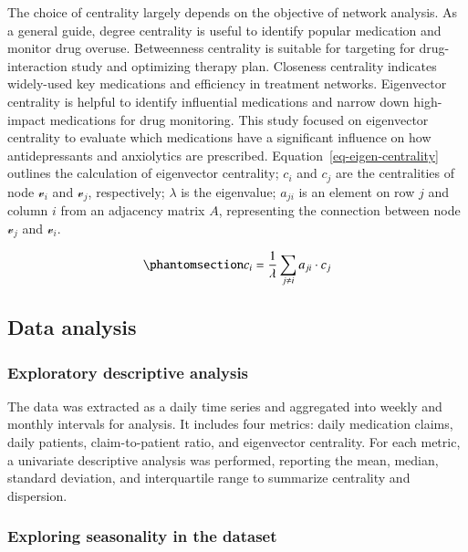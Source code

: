\documentclass[
  authoryear,
  review]{elsarticle}
\begin{document}
The choice of centrality largely depends on the objective of network
analysis. As a general guide, degree centrality is useful to identify
popular medication and monitor drug overuse. Betweenness centrality is
suitable for targeting for drug-interaction study and optimizing therapy
plan. Closeness centrality indicates widely-used key medications and
efficiency in treatment networks. Eigenvector centrality is helpful to
identify influential medications and narrow down high-impact medications
for drug monitoring. This study focused on eigenvector centrality to
evaluate which medications have a significant influence on how
antidepressants and anxiolytics are prescribed.
Equation~\ref{eq-eigen-centrality} outlines the calculation of
eigenvector centrality; \(c_i\) and \(c_j\) are the centralities of node
\(\mathcal{v}_i\) and \(\mathcal{v}_j\), respectively; \(\lambda\) is
the eigenvalue; \(a_{ji}\) is an element on row \(j\) and column \(i\)
from an adjacency matrix \(A\), representing the connection between node
\(\mathcal{v}_j\) and \(\mathcal{v}_i\).

\begin{equation}\phantomsection\label{eq-eigen-centrality}{
\displaystyle c_i = \frac{1}{\lambda} \sum_{j \neq i} a_{ji} \cdot c_j
}\end{equation}

\subsection{Data analysis}\label{data-analysis}

\subsubsection{Exploratory descriptive
analysis}\label{exploratory-descriptive-analysis}

The data was extracted as a daily time series and aggregated into weekly
and monthly intervals for analysis. It includes four metrics: daily
medication claims, daily patients, claim-to-patient ratio, and
eigenvector centrality. For each metric, a univariate descriptive
analysis was performed, reporting the mean, median, standard deviation,
and interquartile range to summarize centrality and dispersion.

\subsubsection{Exploring seasonality in the
dataset}\label{exploring-seasonality-in-the-dataset}
\end{document}
